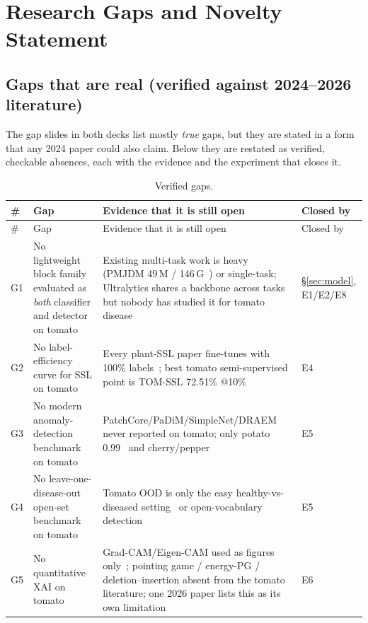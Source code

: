 \section{Research Gaps and Novelty Statement}
\label{sec:novelty}

\subsection{Gaps that are real (verified against 2024--2026 literature)}
The gap slides in both decks list mostly \emph{true} gaps, but they are stated in a form that any 2024 paper could also claim. Below they are restated as verified, checkable absences, each with the evidence and the experiment that closes it.

\begin{longtable}{@{}L{0.6cm}L{4.7cm}L{6.4cm}L{4.2cm}@{}}
\caption{Verified gaps.}\label{tab:gaps}\\
\toprule
\# & Gap & Evidence that it is still open & Closed by \\
\midrule
\endfirsthead
\toprule
\# & Gap & Evidence that it is still open & Closed by \\
\midrule
\endhead
\bottomrule
\endfoot
G1 & No lightweight block family evaluated as \emph{both} classifier and detector on tomato & Existing multi-task work is heavy (PMJDM 49\,M / 146\,G~\cite{pmjdm}) or single-task; Ultralytics shares a backbone across tasks but nobody has studied it for tomato disease & \S\ref{sec:model}, E1/E2/E8 \\
G2 & No label-efficiency curve for SSL on tomato & Every plant-SSL paper fine-tunes with 100\% labels~\cite{plantclr,sonavane2026,conmamba}; best tomato semi-supervised point is TOM-SSL 72.51\% @10\%~\cite{tomssl2025} & E4 \\
G3 & No modern anomaly-detection benchmark on tomato & PatchCore/PaDiM/SimpleNet/DRAEM never reported on tomato; only potato 0.99~\cite{katafuchi2021} and cherry/pepper~\cite{calabro2022} & E5 \\
G4 & No leave-one-disease-out open-set benchmark on tomato & Tomato OOD is only the easy healthy-vs-diseased setting~\cite{dong2024,dong2025} or open-vocabulary detection~\cite{pdcvld} & E5 \\
G5 & No quantitative XAI on tomato & Grad-CAM/Eigen-CAM used as figures only~\cite{xsetomatonet,leafdet,gunasekaran2026}; pointing game / energy-PG / deletion--insertion absent from the tomato literature; one 2026 paper lists this as its own limitation~\cite{scirep2026xai} & E6 \\

\end{longtable}
